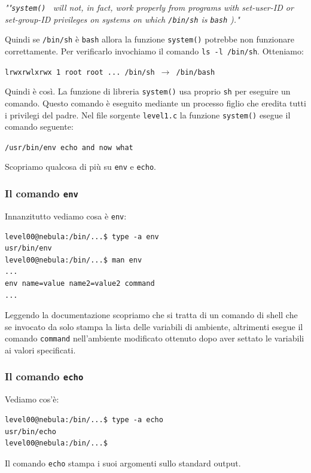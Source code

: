 \begin{center}
    \textit{""\texttt{system() } will not, in fact, work properly from
programs with set-user-ID or set-group-ID privileges
on systems on which \texttt{/bin/sh} is \texttt{bash} )."}
\end{center}
Quindi se \texttt{/bin/sh} è \texttt{bash} allora la funzione \texttt{system()} potrebbe non funzionare correttamente. Per verificarlo invochiamo il comando \texttt{ls -l /bin/sh}. Otteniamo:
\begin{center}
    \texttt{lrwxrwlxrwx 1 root root ... /bin/sh \(\rightarrow\) /bin/bash}
\end{center}
Quindi è così. La funzione di libreria \texttt{system()} usa proprio \texttt{sh} per eseguire un comando. Questo comando è eseguito mediante un processo figlio che eredita tutti i privilegi del padre. Nel file sorgente \texttt{level1.c} la funzione \texttt{system()} esegue il comando seguente:
\begin{center}
    \texttt{/usr/bin/env echo and now what}
\end{center}
Scopriamo qualcosa di più su \texttt{env} e \texttt{echo}.

\subsubsection{Il comando \texttt{env}}
Innanzitutto vediamo cosa è \texttt{env}:

\begin{mdframed}[backgroundcolor=white!20,shadow=false]
\begin{lstlisting}
level00@nebula:/bin/...$ type -a env
usr/bin/env
level00@nebula:/bin/...$ man env
...
env name=value name2=value2 command
...
\end{lstlisting}

\end{mdframed}
Leggendo la documentazione scopriamo che si tratta di un comando di shell che se invocato da solo stampa la lista delle variabili di ambiente, altrimenti esegue il comando \texttt{command} nell'ambiente modificato ottenuto dopo aver settato le variabili ai valori specificati.

\subsubsection{Il comando \texttt{echo}}
Vediamo cos'è:
\begin{mdframed}[backgroundcolor=white!20,shadow=false]
\begin{lstlisting}
level00@nebula:/bin/...$ type -a echo
usr/bin/echo
level00@nebula:/bin/...$ 
\end{lstlisting}
\end{mdframed}
Il comando \texttt{echo} stampa i suoi argomenti sullo standard output.

